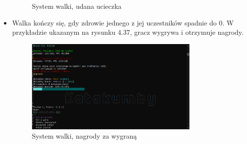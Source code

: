 \begin{itemize}
\begin{figure}[H]
                \caption{System walki, udana ucieczka}
                \label{fig:battles_5}
            \end{figure}
        \item Walka kończy się, gdy zdrowie jednego z jej uczestników spadnie do 0. W przykładzie ukazanym na rysunku 4.37, gracz wygrywa
        i otrzymuje nagrody.
            \begin{figure}[H]
                \centering
                \includegraphics[width=0.8\textwidth]{figures/warstwa_uzytkowa/walka_6.png}
                \caption{System walki, nagrody za wygraną}
                \label{fig:battles_6}
            \end{figure}
\end{itemize}



